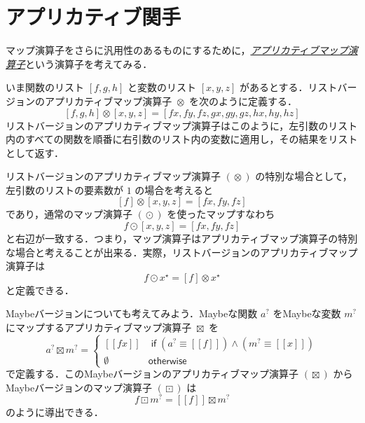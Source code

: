 \documentclass[a4paper]{jsbook}
\def\[{\left[\!\left[}
\def\]{\right]\!\right]}
\newcommand{\keyword}[1]{{\underline{\emph{#1}}}}
\newcommand{\mNothing}{\emptyset}
\newcommand{\mKeyword}[1]{\mathsf{#1}}
\newcommand{\mIfKeyword}{\mKeyword{if}}
\newcommand{\mOtherwiseKeyword}{\mKeyword{otherwise}}
\newcommand{\mListWith}[1]{\left[#1\right]}
\newcommand{\mMaybeWith}[1]{\[#1\]}
\newcommand{\mList}[1]{{#1}^\mathrm{\star}}
\newcommand{\mMaybe}[1]{{#1}^\text{?}}
\DeclareMathOperator{\mMapList}{\odot}
\DeclareMathOperator{\mMapMaybe}{\boxdot}
\DeclareMathOperator{\mApplicativeMapList}{\otimes}
\DeclareMathOperator{\mApplicativeMapMaybe}{\boxtimes}
\DeclareMathOperator{\mLogicalAnd}{\wedge}
\DeclareMathOperator{\mIf}{\mIfKeyword}
\DeclareMathOperator{\mOtherwise}{\mOtherwiseKeyword}
\begin{document}
\section{アプリカティブ関手}

マップ演算子をさらに汎用性のあるものにするために，\keyword{アプリカティブマップ演算子}という演算子を考えてみる．

いま関数のリスト $\mListWith{f,g,h}$ と変数のリスト $\mListWith{x,y,z}$ があるとする．リストバージョンのアプリカティブマップ演算子 $\mApplicativeMapList$ を次のように定義する．
\begin{equation}
\mListWith{f,g,h}\mApplicativeMapList\mListWith{x,y,z}
=\mListWith{fx,fy,fz,gx,gy,gz,hx,hy,hz}
\end{equation}
リストバージョンのアプリカティブマップ演算子はこのように，左引数のリスト内のすべての関数を順番に右引数のリスト内の変数に適用し，その結果をリストとして返す．

リストバージョンのアプリカティブマップ演算子 $(\mApplicativeMapList)$ の特別な場合として，左引数のリストの要素数が $1$ の場合を考えると
\begin{equation}
\mListWith{f}\mApplicativeMapList\mListWith{x,y,z}
=\mListWith{fx,fy,fz}
\end{equation}
であり，通常のマップ演算子 $(\mMapList)$ を使ったマップすなわち
\begin{equation}
f\mMapList\mListWith{x,y,z}
=\mListWith{fx,fy,fz}
\end{equation}
と右辺が一致する．つまり，マップ演算子はアプリカティブマップ演算子の特別な場合と考えることが出来る．実際，リストバージョンのアプリカティブマップ演算子は
\begin{equation}
f\mMapList\mList{x}
=\mListWith{f}\mApplicativeMapList\mList{x}
\end{equation}
と定義できる．

Maybeバージョンについても考えてみよう．Maybeな関数 $\mMaybe{a}$ をMaybeな変数 $\mMaybe{m}$ にマップするアプリカティブマップ演算子 $\mApplicativeMapMaybe$ を
\begin{equation}
\mMaybe{a}\mApplicativeMapMaybe\mMaybe{m}
=\left\{
\begin{array}{ll}
\mMaybeWith{fx}
&\mIf\left(\mMaybe{a}\equiv\mMaybeWith{f}\right)
\mLogicalAnd
\left(\mMaybe{m}\equiv\mMaybeWith{x}\right)\\
\mNothing&\mOtherwise
\end{array}
\right.
\end{equation}
で定義する．このMaybeバージョンのアプリカティブマップ演算子 $(\mApplicativeMapMaybe)$ からMaybeバージョンのマップ演算子 $(\mMapMaybe)$ は
\begin{equation}
f\mMapMaybe\mMaybe{m}
=\mMaybeWith{f}\mApplicativeMapMaybe\mMaybe{m}
\end{equation}
のように導出できる．
\end{document}
